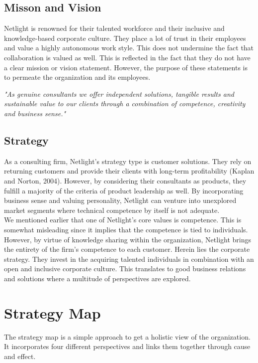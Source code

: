 \documentclass[12pt]{article}
\begin{document}
\subsection*{Misson and Vision}
Netlight is renowned for their talented workforce and their inclusive and knowledge-based corporate culture. They place a lot of trust in their employees and value a highly autonomous work style. This does not undermine the fact that collaboration is valued as well. This is reflected in the fact that they do not have a clear mission or vision statement. However, the purpose of these statements is to permeate the organization and its employees.\newline

\textit{"As genuine consultants we offer independent solutions, tangible results and sustainable value to our clients through a combination of competence, creativity and business sense."}
\subsection*{Strategy}
As a consulting firm, Netlight's strategy type is customer solutions. They rely on returning customers and provide their clients with long-term profitability (Kaplan and Norton, 2004). However, by considering their consultants as products, they fulfill a majority of the criteria of product leadership as well. By incorporating business sense and valuing personality, Netlight can venture into unexplored market segments where technical competence by itself is not adequate. \\
\newline
We mentioned earlier that one of Netlight's core values is competence. This is somewhat misleading since it implies that the competence is tied to individuals. However, by virtue of knowledge sharing within the organization, Netlight brings the entirety of the firm's competence to each customer. Herein lies the corporate strategy. They invest in the acquiring talented individuals in combination with an open and inclusive corporate culture. This translates to good business relations and solutions where a multitude of perspectives are explored.

\section*{Strategy Map}
The strategy map is a simple approach to get a holistic view of the organization. It incorporates four different perspectives and links them together through cause and effect.
\end{document}
